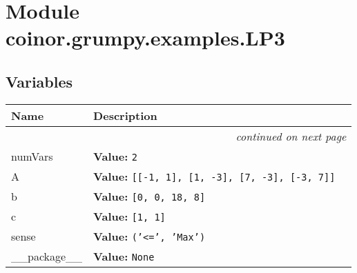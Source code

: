 %
%
%


\section{Module coinor.grumpy.examples.LP3}

    \label{coinor:grumpy:examples:LP3}


  \subsection{Variables}

    \vspace{-1cm}
\hspace{\varindent}\begin{longtable}{|p{\varnamewidth}|p{\vardescrwidth}|l}
\cline{1-2}
\cline{1-2} \centering \textbf{Name} & \centering \textbf{Description}& \\
\cline{1-2}
\endhead\cline{1-2}\multicolumn{3}{r}{\small\textit{continued on next page}}\\\endfoot\cline{1-2}
\endlastfoot\raggedright n\-u\-m\-V\-a\-r\-s\- & \raggedright \textbf{Value:} 
{\tt 2}&\\
\cline{1-2}
\raggedright A\- & \raggedright \textbf{Value:} 
{\tt \texttt{[}\texttt{[}-1\texttt{, }1\texttt{]}\texttt{, }\texttt{[}1\texttt{, }-3\texttt{]}\texttt{, }\texttt{[}7\texttt{, }-3\texttt{]}\texttt{, }\texttt{[}-3\texttt{, }7\texttt{]}\texttt{]}}&\\
\cline{1-2}
\raggedright b\- & \raggedright \textbf{Value:} 
{\tt \texttt{[}0\texttt{, }0\texttt{, }18\texttt{, }8\texttt{]}}&\\
\cline{1-2}
\raggedright c\- & \raggedright \textbf{Value:} 
{\tt \texttt{[}1\texttt{, }1\texttt{]}}&\\
\cline{1-2}
\raggedright s\-e\-n\-s\-e\- & \raggedright \textbf{Value:} 
{\tt \texttt{(}\texttt{'}\texttt{{\textless}=}\texttt{'}\texttt{, }\texttt{'}\texttt{Max}\texttt{'}\texttt{)}}&\\
\cline{1-2}
\raggedright \_\-\_\-p\-a\-c\-k\-a\-g\-e\-\_\-\_\- & \raggedright \textbf{Value:} 
{\tt None}&\\
\cline{1-2}
\end{longtable}

